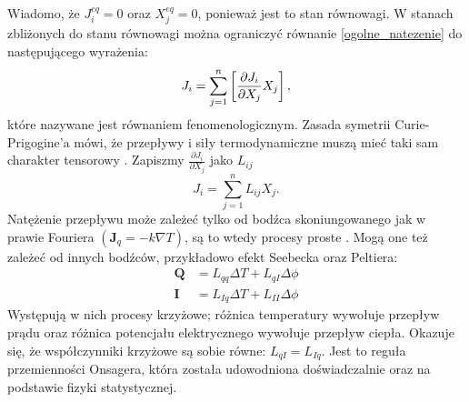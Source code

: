 \documentclass[10pt, a4paper, twoside, onecolumn]{article}
\numberwithin{equation}{section}
\begin{document}
	Wiadomo, że \(J_{i}^{eq}=0\) oraz \(X_{j}^{eq}=0\), ponieważ jest to stan równowagi. W stanach zbliżonych do stanu równowagi można ograniczyć równanie \eqref{ogolne_natezenie} do następującego wyrażenia: 
	\begin{equation}\label{natezenie_liniowe}
		J_{i}=\sum_{j=1}^{n}\left[\pdv{J_{i}}{X_{j}}X_{j}\right],
	\end{equation}
	które nazywane jest równaniem fenomenologicznym. Zasada symetrii Curie-Prigogine'a mówi, że przepływy i siły termodynamiczne muszą mieć taki sam charakter tensorowy \cite{orlik}.
	Zapiszmy \(\frac{\partial J_{i}}{\partial X_{j}}\) jako \(L_{ij}\)
	\begin{equation}
		J_{i}=\sum_{j=1}^{n}L_{ij}X_{j}.
	\end{equation}
	Natężenie przepływu może zależeć tylko od bodźca skoniungowanego jak w prawie Fouriera \(\left(\boldsymbol{J}_{q}=-k\nabla T\right)\), są to wtedy procesy proste \cite{orlik}. Mogą one też zależeć od innych bodźców, przykładowo efekt Seebecka oraz Peltiera: \cite{Ceynowa2008}
	\begin{equation}
	\begin{split}
		\boldsymbol{Q} &= L_{qq}\Delta T+L_{qI}\Delta \phi \\
		\boldsymbol{I} &= L_{Iq}\Delta T+L_{II}\Delta \phi
	\end{split}
	\end{equation}
	Występują w nich procesy krzyżowe; różnica temperatury wywołuje przepływ prądu oraz różnica potencjału elektrycznego wywołuje przepływ ciepła.
	Okazuje się, że współczynniki krzyżowe są sobie równe: \(L_{qI}=L_{Iq}\). Jest to reguła przemienności Onsagera, która została udowodniona doświadczalnie oraz na podstawie fizyki statystycznej. \par
	
	
\end{document}
